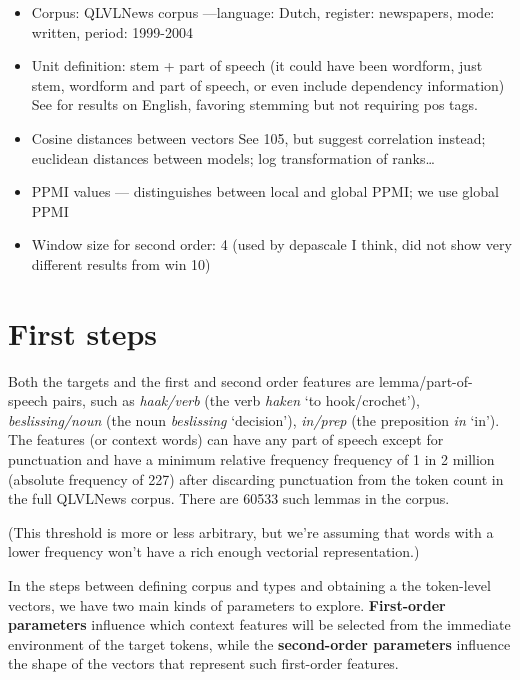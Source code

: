 \documentclass[
]{book}
\begin{document}
\begin{itemize}
\item
  Corpus: QLVLNews corpus ---language: Dutch, register: newspapers, mode: written, period: 1999-2004
\item
  Unit definition: stem + part of speech (it could have been wordform, just stem, wordform and part of speech, or even include dependency information) See \textcite[25]{kiela.clark_2014} for results on English, favoring stemming but not requiring pos tags.
\item
  Cosine distances between vectors See \textcite{jurafsky.martin_2020} 105, but \textcite{kiela.clark_2014} suggest correlation instead; euclidean distances between models; log transformation of ranks\ldots{}
\item
  PPMI values \autocite{kiela.clark_2014,depascale_2019} --- \textcite{vandecruys_2008} distinguishes between local and global PPMI; we use global PPMI
\item
  Window size for second order: 4 (used by depascale I think,
  did not show very different results from win 10)
\end{itemize}

\hypertarget{first-steps}{%
\section{First steps}\label{first-steps}}

Both the targets and the first and second order features are lemma/part-of-speech pairs,
such as \emph{haak/verb} (the verb \emph{haken} `to hook/crochet'),
\emph{beslissing/noun} (the noun \emph{beslissing} `decision'), \emph{in/prep}
(the preposition \emph{in} `in').
The features (or context words) can have any part of speech except for punctuation
and have a minimum relative frequency frequency of 1 in 2 million (absolute frequency of 227)
after discarding punctuation from the token count in the full
QLVLNews corpus. There are 60533 such lemmas in the corpus.

(This threshold is more or less arbitrary, but we're assuming that words with a lower frequency
won't have a rich enough vectorial representation.)

In the steps between defining corpus and types and obtaining a the token-level vectors,
we have two main kinds of parameters to explore.
\textbf{First-order parameters} influence which context features will be selected
from the immediate environment of the target tokens,
while the \textbf{second-order parameters} influence the shape of the vectors
that represent such first-order features.
\end{document}
